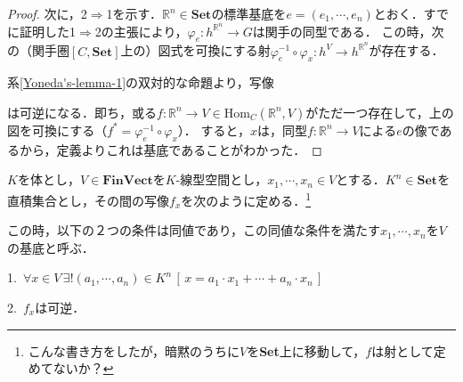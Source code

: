 \documentclass[uplatex, dvipdfmx]{jsreport}
\begin{document}
\begin{proof}
    次に，2$\Rightarrow$1を示す．$\mathbb{R}^n\in\mathbf{Set}$の標準基底を$e=(e_1,\cdots,e_n)$とおく．すでに証明した1$\Rightarrow$2の主張により，$\varphi_e:h^{\mathbb{R}^n}\to G$は関手の同型である．
    この時，次の（関手圏$[C,\mathbf{Set}]$上の）図式を可換にする射$\varphi_e^{-1}\circ\varphi_x:h^V\to h^{\mathbb{R}^n}$が存在する．
    \begin{center}\end{center}
    系\ref{Yoneda's-lemma-1}の双対的な命題より，写像
    \begin{center}\end{center}
    は可逆になる．即ち，或る$f:\mathbb{R}^n\to V\in\mathrm{Hom}_C(\mathbb{R}^n,V)$がただ一つ存在して，上の図を可換にする（$f^*=\varphi_e^{-1}\circ\varphi_x$）．
    すると，$x$は，同型$f:\mathbb{R}^n\to V$による$e$の像であるから，定義よりこれは基底であることがわかった．
\end{proof}
\begin{shadebox}\begin{definition}[基底の定義（参考）]\rm{}
    $K$を体とし，$V\in\mathbf{FinVect}$を$K$-線型空間とし，$x_1,\cdots,x_n\in V$とする．$K^n\in\mathbf{Set}$を直積集合とし，その間の写像$f_x$を次のように定める．\footnote{こんな書き方をしたが，暗黙のうちに$V$を\textbf{Set}上に移動して，$f$は射として定めてないか？}
    \begin{center}\end{center}
    この時，以下の２つの条件は同値であり，この同値な条件を満たす$x_1,\cdots,x_n$を$V$の基底と呼ぶ．

    1.\, $\forall x\in V\, \exists ! (a_1,\cdots,a_n)\in K^n \, [\, x=a_1\cdot x_1+\cdots +a_n\cdot x_n \,]$

    2.\, $f_x$は可逆．
\end{definition}\end{shadebox}
\end{document}
